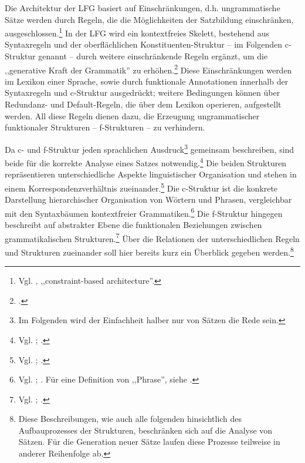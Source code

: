 \documentclass[12pt,a4paper]{article}
\begin{document}
Die Architektur der LFG basiert auf Einschränkungen, d.h. ungrammatische Sätze werden durch Regeln, die die Möglichkeiten der Satzbildung einschränken, ausgeschlossen.\footnote{Vgl. \cite[vii (preface)]{Bresnan}, ,,constraint-based architecture''.}
In der LFG wird ein kontextfreies Skelett, bestehend aus Syntaxregeln und der oberflächlichen Konstituenten-Struktur – im Folgenden c-Struktur genannt --  durch weitere einschränkende Regeln ergänzt, um die ,,generative Kraft der Grammatik'' zu erhöhen.\footnote{\cite[9]{Rohrer}.} Diese Einschränkungen werden im Lexikon einer Sprache, sowie durch funktionale Annotationen innerhalb der Syntaxregeln und c-Struktur ausgedrückt; weitere Bedingungen können über Redundanz- und Default-Regeln, die über dem Lexikon operieren, aufgestellt werden. All diese Regeln dienen dazu, die Erzeugung ungrammatischer funktionaler Strukturen -- f-Strukturen -- zu verhindern.

Da c- und f-Struktur jeden sprachlichen Ausdruck\footnote{Im Folgenden wird der Einfachheit halber nur von Sätzen die Rede sein.} gemeinsam beschreiben, sind beide für die korrekte Analyse eines Satzes notwendig.\footnote{Vgl. \cite[3]{Dal}; \cite[4; 8]{Skript}.} Die beiden Strukturen repräsentieren unterschiedliche Aspekte linguistischer Organisation und stehen in einem Korrespondenzverhältnis zueinander.\footnote{Vgl. \cite[1]{Dal}; \cite[26-7; 35]{Rohrer}.} Die c-Struktur ist die konkrete Darstellung hierarchischer Organisation von Wörtern und Phrasen, vergleichbar mit den Syntaxbäumen kontextfreier Grammatiken.\footnote{Vgl. \cite[7]{Dal}; \cite[13]{Rohrer}. Für eine Definition von ,,Phrase'', siehe \cite[5]{Bresnan}.} Die f-Struktur hingegen beschreibt auf abstrakter Ebene die funktionalen Beziehungen zwischen grammatikalischen Strukturen.\footnote{Vgl. \cite[7]{Dal}; \cite[4]{Skript}.} Über die Relationen der unterschiedlichen Regeln und Strukturen zueinander soll hier bereits kurz ein Überblick gegeben werden.\footnote{Diese Beschreibungen, wie auch alle folgenden hinsichtlich des Aufbauprozesses der Strukturen, beschränken sich auf die Analyse von Sätzen. Für die Generation neuer Sätze laufen diese Prozesse teilweise in anderer Reihenfolge ab.}
\end{document}
